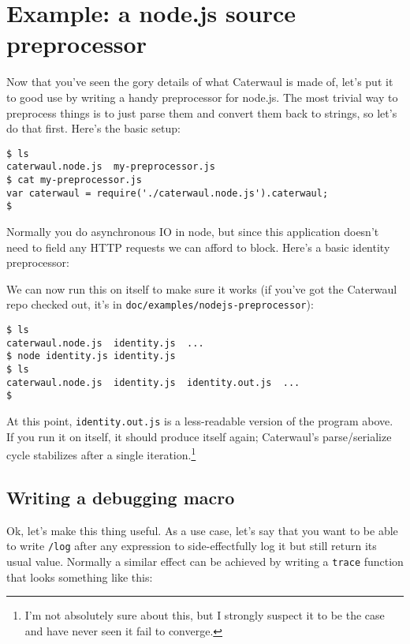 \documentclass{report}
\begin{document}
\chapter{Example: a node.js source preprocessor}
  Now that you've seen the gory details of what Caterwaul is made of, let's put it to good use by writing a handy preprocessor for node.js. The most trivial way to preprocess things is to just
  parse them and convert them back to strings, so let's do that first. Here's the basic setup:

\begin{verbatim}
$ ls
caterwaul.node.js  my-preprocessor.js
$ cat my-preprocessor.js
var caterwaul = require('./caterwaul.node.js').caterwaul;
$
\end{verbatim}

  Normally you do asynchronous IO in node, but since this application doesn't need to field any HTTP requests we can afford to block. Here's a basic identity preprocessor:


  We can now run this on itself to make sure it works (if you've got the Caterwaul repo checked out, it's in {\tt doc/examples/nodejs-preprocessor}):

\begin{verbatim}
$ ls
caterwaul.node.js  identity.js  ...
$ node identity.js identity.js
$ ls
caterwaul.node.js  identity.js  identity.out.js  ...
$
\end{verbatim}

  At this point, {\tt identity.out.js} is a less-readable version of the program above. If you run it on itself, it should produce itself again; Caterwaul's parse/serialize cycle stabilizes
  after a single iteration.\footnote{I'm not absolutely sure about this, but I strongly suspect it to be the case and have never seen it fail to converge.} 

\section{Writing a debugging macro}
    Ok, let's make this thing useful. As a use case, let's say that you want to be able to write {\tt /log} after any expression to side-effectfully log it but still return its usual value.
    Normally a similar effect can be achieved by writing a {\tt trace} function that looks something like this:
\end{document}
